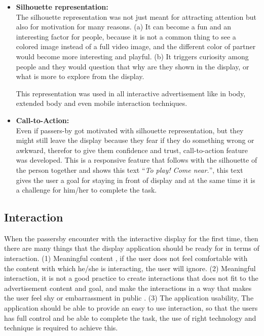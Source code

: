 \begin{itemize}

\item \textbf{Silhouette representation:}\\
The silhouette representation was not just meant for attracting attention but also for motivation for many reasons. (a) It can become a fun and an interesting factor for people, because it is not a common thing to see a colored image instead of a full video image, and the different color of partner would become more interesting and playful. (b) It triggers curiosity among people and they would question that why are they shown in the display, or what is more to explore from the display. 

This representation was used in all interactive advertisement like in body, extended body and even mobile interaction techniques.

\item \textbf{Call-to-Action:} \\
Even if passers-by got motivated with silhouette representation, but they might still leave the display because they fear if they do something wrong or awkward, therefor to give them confidence and trust, call-to-action feature was developed. This is a responsive feature that follows with the silhouette of the person together and shows this text ``\emph{To play! Come near.}'', this text gives the user a goal for staying in front of display and at the same time it is a challenge for him/her to complete the task.

\end{itemize}


\subsection{Interaction}
When the passersby encounter with the interactive display for the first time, then there are many things that the display application should be ready for in terms of interaction. (1) Meaningful content \cite{ Meaningful_ad}, if the user does not feel comfortable with the content with which he/she is interacting, the user will ignore. (2) Meaningful interaction, it is not a good practice to create interactions that does not fit to the advertisement content and goal, and make the interactions in a way that makes the user feel shy or embarrassment in public \cite{EnticingPeople}. (3) The application usability,  The application should be able to provide an easy to use interaction, so that the users has full control and be able to complete the task, the use of right technology and technique is required to achieve this.

